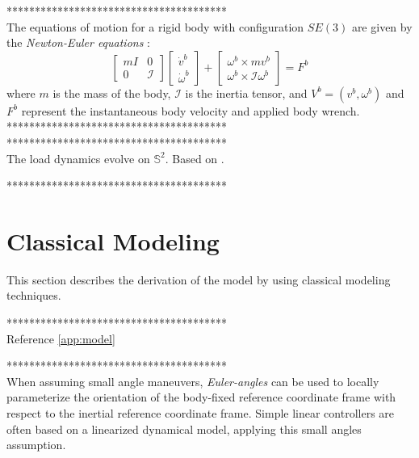 ***************************************\\
The equations of motion for a rigid body with configuration $ SE(3) $ are given by the \textit{Newton-Euler equations} \cite{Murray1994}:
\begin{equation}\label{key}
\begin{bmatrix}
	mI&0\\
	0&\mathcal{I}
\end{bmatrix}
\begin{bmatrix}
	\dot{v}^b\\
	\dot{\omega}^b
\end{bmatrix}+
\begin{bmatrix}
	\omega^b\times mv^b\\
	\omega^b\times\mathcal{I}\omega^b
\end{bmatrix}=F^b
\end{equation}
where $ m $ is the mass of the body, $ \mathcal{I} $ is the inertia tensor, and $ V^b=(v^b,\omega^b) $ and $ F^b $ represent the instantaneous body velocity and applied body wrench.
***************************************\\


***************************************\\
The load dynamics evolve on $\mathbb{S}^2 $.
Based on \cite{Lee2011}.

***************************************\\


\section{Classical Modeling}

This section describes the derivation of the model by using classical modeling techniques.

***************************************\\
Reference \ref{app:model}

***************************************\\

When assuming small angle maneuvers, \textit{Euler-angles} can be used to locally parameterize the orientation of the body-fixed reference coordinate frame with respect to the inertial reference coordinate frame. Simple linear controllers are often based on a linearized dynamical model, applying this small angles assumption. 

